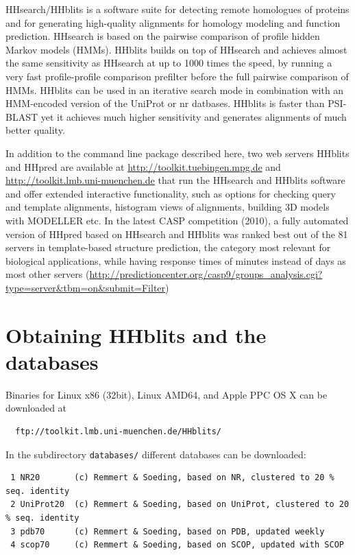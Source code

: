 \documentclass[11pt,a4paper]{article}
\begin{document}
{\noindent HHsearch/HHblits is a software suite for detecting remote homologues of proteins and for generating high-quality alignments for homology modeling and function prediction. HHsearch is based on the pairwise comparison of profile hidden Markov models (HMMs). HHblits builds on top of HHsearch and achieves almost the same sensitivity as HHsearch at up to 1000 times the speed, by running a very fast profile-profile comparison prefilter before the full pairwise comparison of HMMs. HHblits can be used in an iterative search mode in combination with an HMM-encoded version of the UniProt or nr datbases. HHblits is faster than PSI-BLAST yet it achieves much higher sensitivity and generates alignments of much better quality.

In addition to the command line package described here, two web servers HHblits and HHpred are available at \url{http://toolkit.tuebingen.mpg.de} and \url{http://toolkit.lmb.uni-muenchen.de} that run the HHsearch and HHblits software and offer extended interactive functionality,  such as options for checking  query and template alignments, histogram views of alignments, building 3D models with MODELLER etc. In the latest CASP competition (2010), a fully automated version of HHpred based on HHsearch and HHblits was ranked best out of the 81 servers in template-based structure prediction, the category most relevant for biological applications, while having response times of minutes instead of days as most other servers (\url{http://predictioncenter.org/casp9/groups_analysis.cgi?type=server&tbm=on&submit=Filter}) 
}

\newpage

\setlength{\parskip}{0mm}
\tableofcontents
\setlength{\parskip}{2mm}

\newpage

\section{Obtaining HHblits and the databases}

Binaries for Linux x86 (32bit), Linux AMD64, and Apple PPC OS X can be downloaded at
\begin{verbatim}
  ftp://toolkit.lmb.uni-muenchen.de/HHblits/
\end{verbatim}

In the subdirectory \verb`databases/` different databases can be downloaded:
\small 
\begin{verbatim}
 1 NR20       (c) Remmert & Soeding, based on NR, clustered to 20 % seq. identity
 2 UniProt20  (c) Remmert & Soeding, based on UniProt, clustered to 20 % seq. identity
 3 pdb70      (c) Remmert & Soeding, based on PDB, updated weekly
 4 scop70     (c) Remmert & Soeding, based on SCOP, updated with SCOP
\end{verbatim} 
\normalsize
\end{document}
